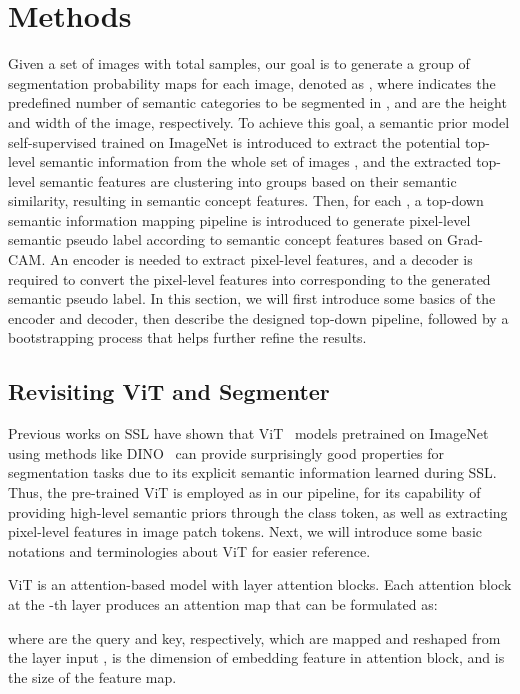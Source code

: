 \documentclass[runningheads]{llncs}
\begin{document}
\section{Methods}

Given a set of images  with total  samples, 
our goal is to generate a group of  segmentation probability maps for each image, denoted as , where  indicates the predefined number of semantic categories to be segmented in , and  are the height and width of the image, respectively. To achieve this goal, a semantic prior model self-supervised trained on ImageNet is introduced to extract the potential top-level semantic information from the whole set of images , and the extracted top-level semantic features are clustering into  groups based on their semantic similarity, resulting in  semantic concept features. Then, for each , a top-down semantic information mapping pipeline is introduced to generate pixel-level semantic pseudo label according to  semantic concept features based on Grad-CAM. An encoder is needed to extract pixel-level features, and a decoder is required to convert the pixel-level features into  corresponding to the generated semantic pseudo label. In this section, we will first introduce some basics of the encoder and decoder, then describe the designed top-down pipeline, followed by a bootstrapping process that helps further refine the results.


\subsection{Revisiting ViT and Segmenter} 
Previous works on SSL have shown that ViT~\cite{dosovitskiy2020ViT}  models pretrained on ImageNet using methods like 
DINO~\cite{DINO} can provide surprisingly good properties for segmentation tasks due to its explicit semantic information learned during SSL. Thus, the pre-trained ViT is employed as  in our pipeline, for its capability of providing high-level semantic priors through the class token, as well as extracting pixel-level features in image patch tokens. Next, we will introduce some basic notations and terminologies about ViT for easier reference.

ViT is an attention-based model with  layer attention blocks. Each attention block at the -th layer produces an attention map  that can be formulated as:

where  are the query and key, respectively, which are mapped and reshaped from the layer input ,  is the dimension of embedding feature in attention block, and  is the size of the feature map.
\end{document}
